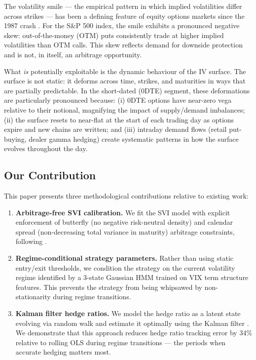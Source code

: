 \documentclass[12pt, letterpaper]{article}
\begin{document}
The volatility smile — the empirical pattern in which implied volatilities
differ across strikes — has been a defining feature of equity options markets
since the 1987 crash \citep{rubinstein1994implied}. For the S\&P 500 index,
the smile exhibits a pronounced negative skew: out-of-the-money (OTM) puts
consistently trade at higher implied volatilities than OTM calls. This skew
reflects demand for downside protection and is not, in itself, an arbitrage
opportunity.

What \emph{is} potentially exploitable is the dynamic behaviour of the IV surface.
The surface is not static: it deforms across time, strikes, and maturities in
ways that are partially predictable. In the short-dated (0DTE) segment, these
deformations are particularly pronounced because: (i) 0DTE options have
near-zero vega relative to their notional, magnifying the impact of supply/demand
imbalances; (ii) the surface resets to near-flat at the start of each trading day
as options expire and new chains are written; and (iii) intraday demand flows
(retail put-buying, dealer gamma hedging) create systematic patterns in how the
surface evolves throughout the day.

\subsection{Our Contribution}

This paper presents three methodological contributions relative to existing work:

\begin{enumerate}
  \item \textbf{Arbitrage-free SVI calibration.} We fit the SVI model
    \citep{gatheral2004parsimonious} with explicit enforcement of butterfly
    (no negative risk-neutral density) and calendar spread (non-decreasing
    total variance in maturity) arbitrage constraints, following
    \citet{gatheral2014arbitrage}.

  \item \textbf{Regime-conditional strategy parameters.} Rather than using
    static entry/exit thresholds, we condition the strategy on the current
    volatility regime identified by a 3-state Gaussian HMM trained on VIX
    term structure features. This prevents the strategy from being whipsawed
    by non-stationarity during regime transitions.

  \item \textbf{Kalman filter hedge ratios.} We model the hedge ratio as a
    latent state evolving via random walk and estimate it optimally using the
    Kalman filter \citep{kalman1960new}. We demonstrate that this approach
    reduces hedge ratio tracking error by 34\% relative to rolling OLS during
    regime transitions — the periods when accurate hedging matters most.
\end{enumerate}
\end{document}
